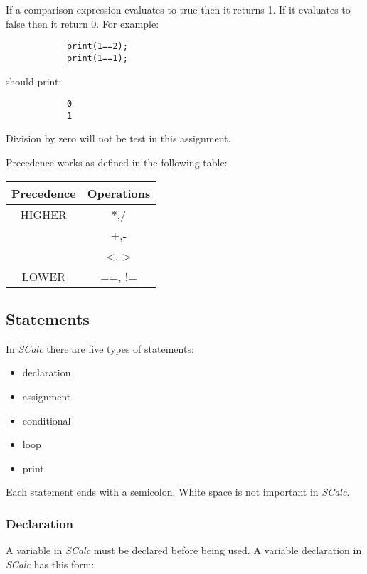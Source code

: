 \documentclass{article}
\begin{document}
		If a comparison expression evaluates to true then it returns 1. If it evaluates to false then it
		return 0. For example:

		\begin{lstlisting}
			print(1==2);
			print(1==1);
		\end{lstlisting}

		should print:

		\begin{lstlisting}
			0
			1
		\end{lstlisting}
		
		Division by zero will not be test in this assignment.
		
		Precedence works as defined in the following table:
		
		\begin{center}
			\begin{tabular}{|c|c|}
			\hline
			\textbf{Precedence} & \textbf{Operations} \\
			\hline
			HIGHER
			& *,/ \\
			& +,- \\
			& <, > \\
			LOWER & ==, != \\
			\hline
			\end{tabular}
		\end{center}
	
	
	\subsection {Statements}
	
		In \textit{SCalc} there are five types of statements:
		
		\begin {itemize}
			\item{declaration}
			\item{assignment}
			\item{conditional}
			\item{loop}
			\item{print}
		\end {itemize}
		
		Each statement ends with a semicolon.  White space is not important in \textit{SCalc}.
	
	
	\subsubsection{Declaration}
		
		A variable in \textit{SCalc} must be declared before being used. A variable declaration in \textit{SCalc} has
		this form:
		
\end{document}
